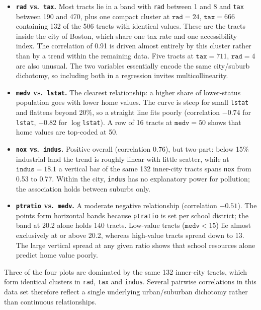 \documentclass[11pt]{article}
\begin{document}
\begin{itemize}
  \item \textbf{\texttt{rad} vs.\ \texttt{tax}.} Most tracts lie in a band with \texttt{rad} between 1 and 8 and \texttt{tax} between 190 and 470, plus one compact cluster at $\texttt{rad} = 24$, $\texttt{tax} = 666$ containing 132 of the 506 tracts with identical values. These are the tracts inside the city of Boston, which share one tax rate and one accessibility index. The correlation of 0.91 is driven almost entirely by this cluster rather than by a trend within the remaining data. Five tracts at $\texttt{tax} = 711$, $\texttt{rad} = 4$ are also unusual. The two variables essentially encode the same city/suburb dichotomy, so including both in a regression invites multicollinearity.
  \item \textbf{\texttt{medv} vs.\ \texttt{lstat}.} The clearest relationship: a higher share of lower-status population goes with lower home values. The curve is steep for small \texttt{lstat} and flattens beyond 20\%, so a straight line fits poorly (correlation $-0.74$ for \texttt{lstat}, $-0.82$ for $\log$\texttt{lstat}). A row of 16 tracts at $\texttt{medv} = 50$ shows that home values are top-coded at 50.
  \item \textbf{\texttt{nox} vs.\ \texttt{indus}.} Positive overall (correlation 0.76), but two-part: below 15\% industrial land the trend is roughly linear with little scatter, while at $\texttt{indus} = 18.1$ a vertical bar of the same 132 inner-city tracts spans \texttt{nox} from 0.53 to 0.77. Within the city, \texttt{indus} has no explanatory power for pollution; the association holds between suburbs only.
  \item \textbf{\texttt{ptratio} vs.\ \texttt{medv}.} A moderate negative relationship (correlation $-0.51$). The points form horizontal bands because \texttt{ptratio} is set per school district; the band at 20.2 alone holds 140 tracts. Low-value tracts ($\texttt{medv} < 15$) lie almost exclusively at or above 20.2, whereas high-value tracts spread down to 13. The large vertical spread at any given ratio shows that school resources alone predict home value poorly.
\end{itemize}
Three of the four plots are dominated by the same 132 inner-city tracts, which form identical clusters in \texttt{rad}, \texttt{tax} and \texttt{indus}. Several pairwise correlations in this data set therefore reflect a single underlying urban/suburban dichotomy rather than continuous relationships.
\end{document}
